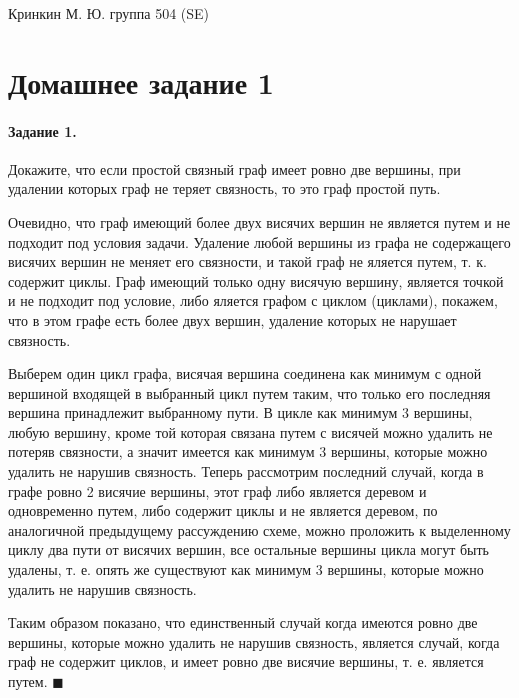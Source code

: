\documentclass[a4paper,12pt]{article}
\begin{document}
\sloppy

\lstset{
	basicstyle=\small,
	stringstyle=\ttfamily,
	showstringspaces=false,
	columns=fixed,
	breaklines=true,
	numbers=right,
	numberstyle=\tiny
}

\newtheorem{Def}{Определение}[section]
\newtheorem{Th}{Теорема}
\newtheorem{Lem}[Th]{Лемма}
\newenvironment{Proof}
	{\par\noindent{\bf Доказательство.}}
	{\hfill$\scriptstyle\blacksquare$}
\newenvironment{Solution}
	{\par\noindent{\bf Решение.}}
	{\hfill$\scriptstyle\blacksquare$}


\begin{flushright}
	Кринкин М. Ю. группа 504 (SE)
\end{flushright}

\section{Домашнее задание 1}

\paragraph{Задание 1.} Докажите, что если простой связный граф имеет ровно две вершины, при удалении которых граф не теряет связность, то это граф простой путь.
\begin{Solution}
Очевидно, что граф имеющий более двух висячих вершин не является путем и не подходит под условия задачи. Удаление любой вершины из графа не содержащего висячих вершин не меняет его связности, и такой граф не яляется путем, т. к. содержит циклы. Граф имеющий только одну висячую вершину, является точкой и не подходит под условие, либо яляется графом с циклом (циклами), покажем, что в этом графе есть более двух вершин, удаление которых не нарушает связность.

Выберем один цикл графа, висячая вершина соединена как минимум с одной вершиной входящей в выбранный цикл путем таким, что только его последняя вершина принадлежит выбранному пути. В цикле как минимум 3 вершины, любую вершину, кроме той которая связана путем с висячей можно удалить не потеряв связности, а значит имеется как минимум 3 вершины, которые можно удалить не нарушив связность. Теперь рассмотрим последний случай, когда в графе ровно 2 висячие вершины, этот граф либо является деревом и одновременно путем, либо содержит циклы и не является деревом, по аналогичной предыдущему рассуждению схеме, можно проложить к выделенному циклу два пути от висячих вершин, все остальные вершины цикла могут быть удалены, т. е. опять же существуют как минимум 3 вершины, которые можно удалить не нарушив связность.

Таким образом показано, что единственный случай когда имеются ровно две вершины, которые можно удалить не нарушив связность, является случай, когда граф не содержит циклов, и имеет ровно две висячие вершины, т. е. является путем.
\end{Solution}
\end{document}
